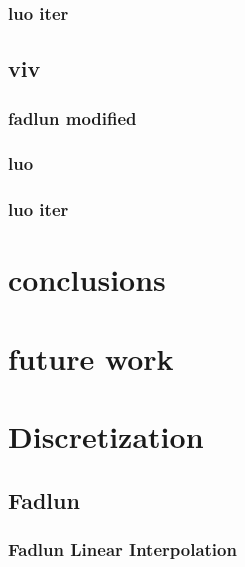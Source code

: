 \documentclass[onehalf,11pt]{beavtex}
\begin{document}
\subsection{luo iter}
\section{viv}
\subsection{fadlun modified}
\subsection{luo}
\subsection{luo iter}
\chapter{conclusions}
\chapter{future work}











\appendix
\chapter{Discretization}
\section{Fadlun}
\subsection{Fadlun Linear Interpolation}\label{Fadlun Linear Interpolation}
\end{document}
